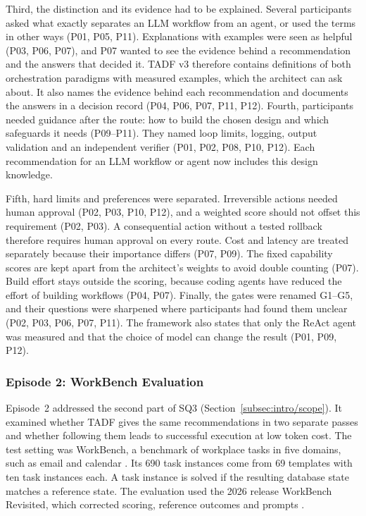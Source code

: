 Third, the distinction and its evidence had to be explained. Several participants asked what exactly separates an LLM workflow from an agent, or used the terms in other ways (P01, P05, P11). Explanations with examples were seen as helpful (P03, P06, P07), and P07 wanted to see the evidence behind a recommendation and the answers that decided it. TADF v3 therefore contains definitions of both orchestration paradigms with measured examples, which the architect can ask about. It also names the evidence behind each recommendation and documents the answers in a decision record (P04, P06, P07, P11, P12). Fourth, participants needed guidance after the route: how to build the chosen design and which safeguards it needs (P09--P11). They named loop limits, logging, output validation and an independent verifier (P01, P02, P08, P10, P12). Each recommendation for an LLM workflow or agent now includes this design knowledge.

Fifth, hard limits and preferences were separated. Irreversible actions needed human approval (P02, P03, P10, P12), and a weighted score should not offset this requirement (P02, P03). A consequential action without a tested rollback therefore requires human approval on every route. Cost and latency are treated separately because their importance differs (P07, P09). The fixed capability scores are kept apart from the architect's weights to avoid double counting (P07). Build effort stays outside the scoring, because coding agents have reduced the effort of building workflows (P04, P07). Finally, the gates were renamed G1--G5, and their questions were sharpened where participants had found them unclear (P02, P03, P06, P07, P11). The framework also states that only the ReAct agent was measured and that the choice of model can change the result (P01, P09, P12).

\subsubsection{Episode 2: WorkBench Evaluation}
\label{subsubsec:TADF/episode2}
\label{subsubsec:TADF/pilots}
Episode~2 addressed the second part of SQ3 (Section~\ref{subsec:intro/scope}). It examined whether TADF gives the same recommendations in two separate passes and whether following them leads to successful execution at low token cost. The test setting was WorkBench, a benchmark of workplace tasks in five domains, such as email and calendar \parencite{stylesWorkBenchBenchmarkDataset2024}. Its 690 task instances come from 69 templates with ten task instances each. A task instance is solved if the resulting database state matches a reference state. The evaluation used the 2026 release WorkBench Revisited, which corrected scoring, reference outcomes and prompts \parencite{stylesWorkBenchRevisitedWorkplace2026}.

